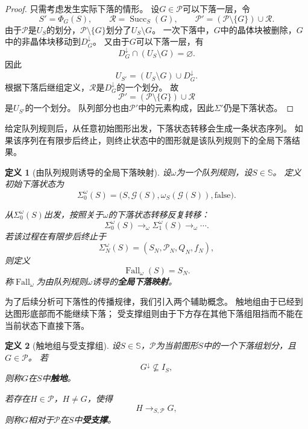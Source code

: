 \documentclass[UTF8,fontset=none]{ctexart}
\theoremstyle{cnthm}
\newtheorem{definition}{定义}[section]
\begin{document}
			\begin{proof}
				只需考虑发生实际下落的情形。
				设$G\in\mathcal{P}$可以下落一层，令
				$$
				S'=\Phi_G(S),
				\qquad
				\mathcal{R}=\operatorname{Succ}_S(G),
				\qquad
				\mathcal{P}'=(\mathcal{P}\setminus\{G\})\cup\mathcal{R}.
				$$
				由于$\mathcal{P}$是$U_S$的划分，$\mathcal{P}\setminus\{G\}$划分了$U_S\setminus G$。
				一次下落中，$G$中的晶体块被删除，$G$中的非晶体块移动到$D_G^\downarrow$。
				又由于$G$可以下落一层，有
				$$
				D_G^\downarrow\cap (U_S\setminus G)=\varnothing.
				$$
				因此
				$$
				U_{S'}
				=
				(U_S\setminus G)\cup D_G^\downarrow.
				$$
				根据下落后继组定义，$\mathcal{R}$是$D_G^\downarrow$的一个划分。
				故
				$$
				\mathcal{P}'=(\mathcal{P}\setminus\{G\})\cup\mathcal{R}
				$$
				是$U_{S'}$的一个划分。
				队列部分也由$\mathcal{P}'$中的元素构成，因此$\Sigma'$仍是下落状态。
			\end{proof}
			
			给定队列规则后，从任意初始图形出发，下落状态转移会生成一条状态序列。
			如果该序列在有限步后终止，则终止状态中的图形就是该队列规则下的全局下落结果。
			
			\begin{definition}[由队列规则诱导的全局下落映射]
				设$\omega$为一个队列规则，设$S\in\mathbb{S}$。
				定义初始下落状态为
				$$
				\Sigma_0^\omega(S)
				=
				\bigl(
				S,
				\mathcal{G}(S),
				\omega_S(\mathcal{G}(S)),
				\mathrm{false}
				\bigr).
				$$
				
				从$\Sigma_0^\omega(S)$出发，按照关于$\omega$的下落状态转移反复转移：
				$$
				\Sigma_0^\omega(S)
				\longrightarrow_\omega
				\Sigma_1^\omega(S)
				\longrightarrow_\omega
				\cdots.
				$$
				若该过程在有限步后终止于
				$$
				\Sigma_N^\omega(S)=(S_N,\mathcal{P}_N,Q_N,f_N),
				$$
				则定义
				$$
				\operatorname{Fall}_{\omega}(S)=S_N.
				$$
				称$\operatorname{Fall}_{\omega}$为由队列规则$\omega$诱导的\textbf{全局下落映射}。
			\end{definition}
			
			为了后续分析可下落性的传播规律，我们引入两个辅助概念。
			触地组由于已经到达图形底部而不能继续下落；
			受支撑组则由于下方存在其他下落组阻挡而不能在当前状态下直接下落。
			
			\begin{definition}[触地组与受支撑组]
				设$S\in\mathbb{S}$，$\mathcal{P}$为当前图形$S$中的一个下落组划分，且$G\in\mathcal{P}$。
				若
				$$
				G^\downarrow\not\subseteq I_S,
				$$
				则称$G$在$S$中\textbf{触地}。
				
				若存在$H\in\mathcal{P}$，$H\neq G$，使得
				$$
				H\to_{S,\mathcal{P}}G,
				$$
				则称$G$相对于$\mathcal{P}$在$S$中\textbf{受支撑}。
			\end{definition}
			
\end{document}
